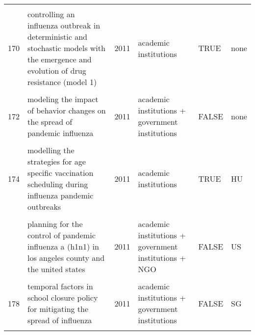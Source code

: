 \documentclass[
]{article}
\begin{document}
\begin{landscape}
\begin{longtable}{l>{\raggedright\arraybackslash}p{4cm}l>{\raggedright\arraybackslash}p{3.5cm}l>{\raggedright\arraybackslash}p{1.5cm}}
\cellcolor{gray!6}{169} & \cellcolor{gray!6}{cholera epidemic in haiti, 2010: using a transmission model to explain spatial spread of disease and identify optimal control interventions} & \cellcolor{gray!6}{2011} & \cellcolor{gray!6}{academic institutions} & \cellcolor{gray!6}{TRUE} & \cellcolor{gray!6}{HT}\\
170 & controlling an influenza outbreak in deterministic and stochastic models with the emergence and evolution of drug resistance (model 1) & 2011 & academic institutions & TRUE & none\\
\addlinespace
\cellcolor{gray!6}{171} & \cellcolor{gray!6}{modeling control strategies for concurrent epidemics of seasonal and pandemic h1n1 influenza} & \cellcolor{gray!6}{2011} & \cellcolor{gray!6}{academic institutions} & \cellcolor{gray!6}{TRUE} & \cellcolor{gray!6}{US}\\
172 & modeling the impact of behavior changes on the spread of pandemic influenza & 2011 & academic institutions + government institutions & FALSE & none\\
\cellcolor{gray!6}{173} & \cellcolor{gray!6}{modelling and analysis of influenza a (h1n1) on networks} & \cellcolor{gray!6}{2011} & \cellcolor{gray!6}{academic institutions + government institutions} & \cellcolor{gray!6}{FALSE} & \cellcolor{gray!6}{CN}\\
174 & modelling the strategies for age specific vaccination scheduling during influenza pandemic outbreaks & 2011 & academic institutions & TRUE & HU\\
\cellcolor{gray!6}{175} & \cellcolor{gray!6}{modelling the transmission dynamics and control of the novel 2009 swine influenza (h1n1) pandemic} & \cellcolor{gray!6}{2011} & \cellcolor{gray!6}{academic institutions} & \cellcolor{gray!6}{TRUE} & \cellcolor{gray!6}{CA}\\
\addlinespace
176 & planning for the control of pandemic influenza a (h1n1) in los angeles county and the united states & 2011 & academic institutions + government institutions + NGO & FALSE & US\\
\cellcolor{gray!6}{177} & \cellcolor{gray!6}{prioritization of delayed vaccination for pandemic influenza} & \cellcolor{gray!6}{2011} & \cellcolor{gray!6}{academic institutions} & \cellcolor{gray!6}{TRUE} & \cellcolor{gray!6}{US}\\
178 & temporal factors in school closure policy for mitigating the spread of influenza & 2011 & academic institutions + government institutions & FALSE & SG\\
\cellcolor{gray!6}{179} & \cellcolor{gray!6}{the global transmission and control of influenza} & \cellcolor{gray!6}{2011} & \cellcolor{gray!6}{academic institutions} & \cellcolor{gray!6}{TRUE} & \cellcolor{gray!6}{global}\\

\end{longtable}
\end{landscape}
\end{document}
